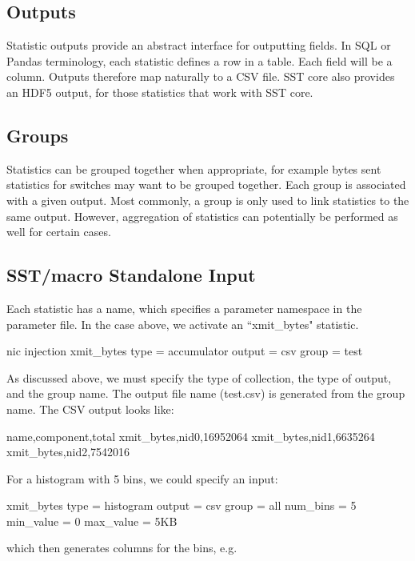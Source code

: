 \subsection{Outputs}
\label{subsec:outputs}

Statistic outputs provide an abstract interface for outputting fields.
In SQL or Pandas terminology, each statistic defines a row in a table. Each field will be a column.
Outputs therefore map naturally to a CSV file.
SST core also provides an HDF5 output, for those statistics that work with SST core.

\subsection{Groups}
\label{subsec:groups}

Statistics can be grouped together when appropriate, for example bytes sent statistics for switches may want to be grouped together.
Each group is associated with a given output.
Most commonly, a group is only used to link statistics to the same output.
However, aggregation of statistics can potentially be performed as well for certain cases.

\subsection{SST/macro Standalone Input}
\label{subsec:standaloneInput}

Each statistic has a name, which specifies a parameter namespace in the parameter file.
In the case above, we activate an ``xmit\_bytes" statistic.

\begin{ViFile}
nic {
  injection {
   xmit_bytes {
     type = accumulator
     output = csv
     group = test
   }
  }
}
\end{ViFile}
As discussed above, we must specify the type of collection, the type of output, and the group name.
The output file name (test.csv) is generated from the group name. The CSV output looks like:

\begin{ViFile}
name,component,total
xmit_bytes,nid0,16952064
xmit_bytes,nid1,6635264
xmit_bytes,nid2,7542016
\end{ViFile}
For a histogram with 5 bins, we could specify an input:

\begin{ViFile}
 xmit_bytes {
  type = histogram
  output = csv
  group = all
  num_bins = 5
  min_value = 0
  max_value = 5KB
}
\end{ViFile}
which then generates columns for the bins, e.g.

